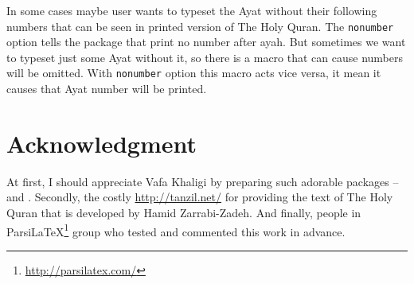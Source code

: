 \documentclass{ltxdoc}
\begin{document}
In some cases maybe user wants to typeset the Ayat without their following numbers that can be seen in printed version of The Holy Quran. The \texttt{nonumber} 
option tells the package that print no number after ayah.
But sometimes we want to typeset just some Ayat without it, so there is a  macro
that can cause numbers will be omitted. With \texttt{nonumber} option this macro acts vice versa, it mean it 
causes that Ayat number will be printed.

\section{Acknowledgment}
At first, I should appreciate Vafa Khaligi by preparing such adorable packages -- and 
. Secondly, the costly \url{http://tanzil.net/} for providing the text of The Holy Quran that 
is developed by Hamid Zarrabi-Zadeh. And finally, people in Parsi\LaTeX\footnote{\url{http://parsilatex.com/}}
group who tested and commented this work in advance. 
\end{document}
